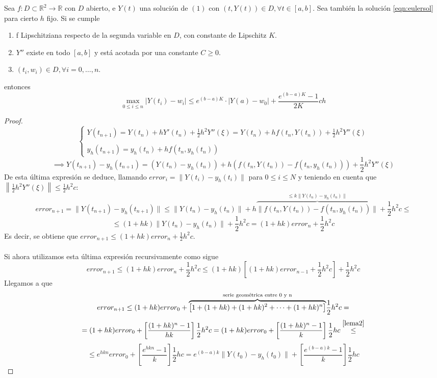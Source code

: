 \begin{theorem}
    Sea $f:D\subset \mathbb{R}^2\rightarrow \mathbb{R}$ con $D$ abierto, e $Y(t)$ una solución de $(1)$ con $(t,Y(t))\in D,\forall t\in[a,b]$. Sea también la solución \ref{eqn:eulersol} para cierto $h$ fijo. Si se cumple
    \begin{enumerate}[label=(\alph*)]
        \item f Lipschitziana respecto de la segunda variable en $D$, con constante de Lipschitz $K$.
        \item $Y''$ existe en todo $[a,b]$ y está acotada por una constante $C\geq 0$.
        \item $(t_i,w_i)\in D,\forall i=0,\dots,n$.
    \end{enumerate}
    entonces $$\max_{0\leq i \leq n}|Y(t_i)-w_i| \leq e^{(b-a)K}\cdot |Y(a)-w_0| + \frac{e^{(b-a)K}-1}{2K}ch$$

\end{theorem}
\begin{proof}
    \begin{equation}
\label{eq1}
\left\{
\begin{array}{l}
Y(t_{n+1}) = Y(t_n) + hY'(t_n) + \frac{1}{2}h^2Y''(\xi) = Y(t_n) + hf(t_n, Y(t_n)) + \frac{1}{2}h^2Y''(\xi)\\
\\
y_h(t_{n+1}) = y_h(t_n) + hf(t_n, y_h(t_n))
\end{array}
\right. 
\end{equation}
\begin{equation}
\label{eq2}
\implies Y(t_{n+1}) - y_h(t_{n+1}) = (Y(t_n) - y_h(t_n)) + h(f(t_n, Y(t_n)) - f(t_n, y_h(t_n))) + \frac{1}{2}h^2Y''(\xi)
\end{equation}
De esta última expresión se deduce, llamando $error_i = \|Y(t_i) - y_h(t_i)\|$ para $0\leq i \leq N$ y teniendo en cuenta que $\left\|\frac{1}{2}h^2Y''(\xi)\right\| \leq \frac{1}{2}h^2c$:
$$
error_{n+1} = \|Y(t_{n+1}) - y_h(t_{n+1})\| \leq \|Y(t_n) - y_h(t_n)\| + h\overset{\leq k\| Y(t_n) - y_h(t_n)\|}{\overbrace{\|f(t_n, Y(t_n)) - f(t_n, y_h(t_n))\|}}  + \frac{1}{2}h^2c \leq
$$
$$
\leq (1+hk)\|Y(t_n) - y_h(t_n)\| + \frac{1}{2}h^2c = (1+hk)error_n + \frac{1}{2}h^2c
$$
Es decir, se obtiene que $error_{n+1} \leq (1+hk)error_n + \frac{1}{2}h^2c$.\\\\Si ahora utilizamos esta última expresión recursivamente como sigue
$$
error_{n+1} \leq (1+hk)error_n + \frac{1}{2}h^2c \leq (1+hk)\left[(1+hk)error_{n-1} + \frac{1}{2}h^2c\right] + \frac{1}{2}h^2c
$$
Llegamos a que
$$
error_{n+1} \leq (1+hk)error_0 + \overset{\textnormal{serie geométrica entre 0 y n}}{\overbrace{\left[ 1 + (1+hk) + (1+hk)^2 + \cdots + (1+hk)^{n}\right]}}\frac{1}{2}h^2c =  
$$
$$
= (1+hk)error_0 + \left[\frac{(1+hk)^n - 1}{hk}\right]\frac{1}{2}h^2c = (1+hk)error_0 + \left[\frac{(1+hk)^n - 1}{k}\right]\frac{1}{2}hc \overset{\ref{lema2}}{\leq} 
$$
$$
\leq e^{hkn}error_0 + \left[\frac{e^{hkn} - 1}{k}\right]\frac{1}{2}hc =  e^{(b-a)k}\|Y(t_0) - y_h(t_0)\| + \left[\frac{e^{(b-a)k} - 1}{k}\right]\frac{1}{2}hc
$$

\end{proof}

